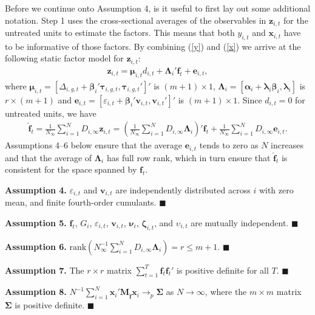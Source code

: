 \documentclass[12pt,fleqn]{article}
\def\*#1{\mathbf{#1}}
\def\+#1{\boldsymbol{#1}}
\begin{document}
Before we continue onto Assumption 4, is it useful to first lay out some additional notation. Step 1 uses the cross-sectional averages of the observables in $\*z_{i,t}$ for the untreated units to estimate the factors. This means that both $y_{i,t}$ and $\*x_{i,t}$ have to be informative of those factors. By combining (\ref{y}) and (\ref{x}) we arrive at the following static factor model for $\*z_{i,t}$:
\begin{align}
\*z_{i,t} = \+\mu_{i,t}d_{i,t} + \+\Lambda_i'\*f_t + \*e_{i,t}, \label{z}
\end{align}
where $\+\mu_{i,t} = [\Delta_{i,g,t} +\+\beta_i'\+\tau_{i,g,t}, \+\tau_{i,g,t}']'$ is $(m+1)\times 1$, $\+\Lambda_i = [\+\alpha_i +\+\lambda_i\+\beta_i, \+\lambda_i]$ is $r\times (m+1)$ and $\*e_{i,t} = [\varepsilon_{i,t} + \+\beta_i'\*v_{i,t}, \*v_{i,t}']'$ is $(m+1)\times 1$. Since $d_{i,t} = 0$ for untreated units, we have
\begin{align}
\widehat{\*f}_t = \frac{1}{N_{\infty}}\sum_{i = 1}^N D_{i,\infty} \*z_{i,t} = \left(\frac{1}{N_{\infty}}\sum_{i = 1}^N D_{i,\infty} \+\Lambda_i\right)'\*f_t + \frac{1}{N_{\infty}}\sum_{i = 1}^N D_{i,\infty}\*e_{i,t}.
\end{align}
Assumptions 4--6 below ensure that the average $\*e_{i,t}$ tends to zero as $N$ increases and that the average of $\+\Lambda_i$ has full row rank, which in turn ensure that $\widehat{\*f}_t$ is consistent for the space spanned by $\*f_t$.

\bigskip

\noindent \textbf{Assumption 4.} $\varepsilon_{i,t}$ and $\*v_{i,t}$ are independently distributed across $i$ with zero mean, and finite fourth-order cumulants. $\blacksquare$

\bigskip

\noindent \textbf{Assumption 5.} $\*f_t$, $G_i$, $\varepsilon_{i,t}$, $\*v_{i,t}$, $\+\nu_i$, $\+\zeta_{i,t}$, and $\upsilon_{i,t}$ are mutually independent. $\blacksquare$

\bigskip

\noindent \textbf{Assumption 6.} $\mathrm{rank}(N_{\infty}^{-1}\sum_{i= 1}^N D_{i,\infty} \+\Lambda_i ) = r \leq m+1$. $\blacksquare$

\bigskip

\noindent \textbf{Assumption 7.} The $r \times r$ matrix $\sum_{t=1}^T\*f_t\*f_t'$ is positive definite for all $T$. $\blacksquare$

\bigskip

\noindent \textbf{Assumption 8.} $N^{-1}\sum_{i=1}^N \*x_{i}'\*M_{\widehat{\*f}} \*x_{i} \to_p \+\Sigma$ as $N\to\infty$, where the $m\times m$ matrix $\+\Sigma$ is positive definite. $\blacksquare$
\end{document}
